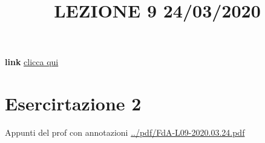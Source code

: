 \newpage
\title{LEZIONE 9 24/03/2020}\newline
\textbf{link} \href{https://web.microsoftstream.com/video/c0596b77-fd44-467c-8085-683611779644?list=user&userId=faa91214-a6f5-40d7-8875-253fd49b8ce1}{clicca qui}
\section{Esercirtazione 2}
Appunti del prof con annotazioni \url{../pdf/FdA-L09-2020.03.24.pdf}